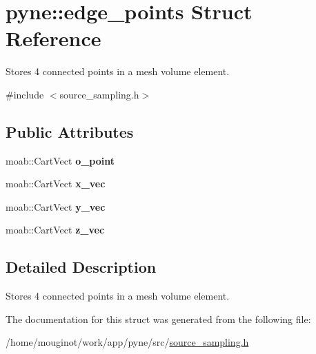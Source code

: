 \hypertarget{structpyne_1_1edge__points}{}\section{pyne\+:\+:edge\+\_\+points Struct Reference}
\label{structpyne_1_1edge__points}


Stores 4 connected points in a mesh volume element.  




{\ttfamily \#include $<$source\+\_\+sampling.\+h$>$}

\subsection*{Public Attributes}
\begin{DoxyCompactItemize}
\item 
\mbox{\label{structpyne_1_1edge__points_ada309b6576a990d7e911fb31ee450d64}} 
moab\+::\+Cart\+Vect {\bfseries o\+\_\+point}
\item 
\mbox{\label{structpyne_1_1edge__points_ace3786aead7c2cbce033bd48c84df18b}} 
moab\+::\+Cart\+Vect {\bfseries x\+\_\+vec}
\item 
\mbox{\label{structpyne_1_1edge__points_a5a7e7f46555011e67e5b55c0a8af20f1}} 
moab\+::\+Cart\+Vect {\bfseries y\+\_\+vec}
\item 
\mbox{\label{structpyne_1_1edge__points_a63554c3a4e3b789665d686dc9af79f85}} 
moab\+::\+Cart\+Vect {\bfseries z\+\_\+vec}
\end{DoxyCompactItemize}


\subsection{Detailed Description}
Stores 4 connected points in a mesh volume element. 

The documentation for this struct was generated from the following file\+:\begin{DoxyCompactItemize}
\item 
/home/mouginot/work/app/pyne/src/\hyperlink{source__sampling_8h}{source\+\_\+sampling.\+h}\end{DoxyCompactItemize}
